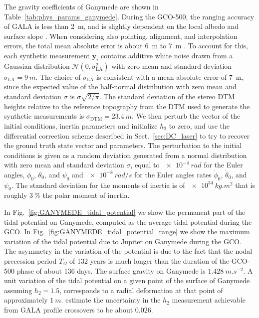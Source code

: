 \documentclass[pdflatex,sn-mathphys-num]{sn-jnl}%
\theoremstyle{thmstyleone}%
\theoremstyle{thmstyletwo}%
\theoremstyle{thmstylethree}%
\renewcommand{\vec}[1]{\boldsymbol{#1}}
\begin{document}
%
The gravity coefficients of Ganymede are shown in Table~\ref{tab:phys_params_ganymede}.
%
During the GCO-500, the ranging accuracy of GALA is less than \SI{2}{m}, and is slightly dependent on the local albedo and surface slope \citep{2015P&SS..117..184S, 2018P&SS..159...84S, 2019Geosc...9..320S}. 
When considering also pointing, alignment, and interpolation errors, the total mean absolute error is about \SI{6}{m} to \SI{7}{m} \citep{2015P&SS..117..184S}.
To account for this, each synthetic measurement $\vec{y}_i$ contains additive white noise drawn from a Gaussian distribution $\mathcal{N}(0, \sigma_{\mathrm{LA}}^2)$ with zero mean and standard deviation $\sigma_{\mathrm{LA}} = \SI{9}{m}$. 
The choice of $\sigma_{\mathrm{LA}}$ is consistent with a mean absolute error of \SI{7}{m}, since the expected value of the half-normal distribution with zero mean and standard deviation $\sigma$ is $\sigma \sqrt{2/\pi}$.
The standard deviation of the stereo DTM heights relative to the reference topography from the DTM used to generate the synthetic measurements is  ${\sigma_{\mathrm{DTM}} = \SI{23.4}{m}}$. 
%
We then perturb the vector of the initial conditions, inertia parameters and initialize $h_2$ to zero, and use the differential correction scheme described in Sect.~\ref{sec:DC_laser} to try to recover the ground truth state vector and parameters.
The perturbation to the initial conditions is given as a random deviation generated from a normal distribution with zero mean and standard deviation $\sigma$, equal to $\SI{e-4}{rad}$ for the Euler angles, $\phi_0$, $\theta_0$, and $\psi_0$ and $\SI{e-8}{rad/s}$ for the Euler angles rates $\dot{\phi}_0$, $\dot{\theta}_0$, and $\dot{\psi}_0$. The standard deviation for the moments of inertia is of $\SI{e34}{kg.m^2}$ that is roughly $\SI{3}{\%}$ the polar moment of inertia. %
	

In Fig.~\ref{fig:GANYMEDE_tidal_potential} we show the permanent part of the tidal potential on Ganymede, computed as the average tidal potential during the GCO. %
In Fig.~\ref{fig:GANYMEDE_tidal_potential_range} we show the maximum variation of the tidal potential due to Jupiter on Ganymede during the GCO. %
The asymmetry in the variation of the potential is due to the fact that the nodal precession period $T_{\Omega}$ of 132 years is much longer than the duration of the GCO-500 phase of about 136 days.
%
The surface gravity on Ganymede is $\SI{1.428}{m.s^{-2}}$.
A unit variation of the tidal potential on a given point of the surface of Ganymede assuming ${h_2 = 1.5}$, corresponds to a radial deformation at that point of approximately $\SI{1}{m}$.
%
\cite{2015P&SS..117..184S} estimate the uncertainty in the $h_2$ measurement achievable from GALA profile crossovers to be about $0.026$.
\end{document}
